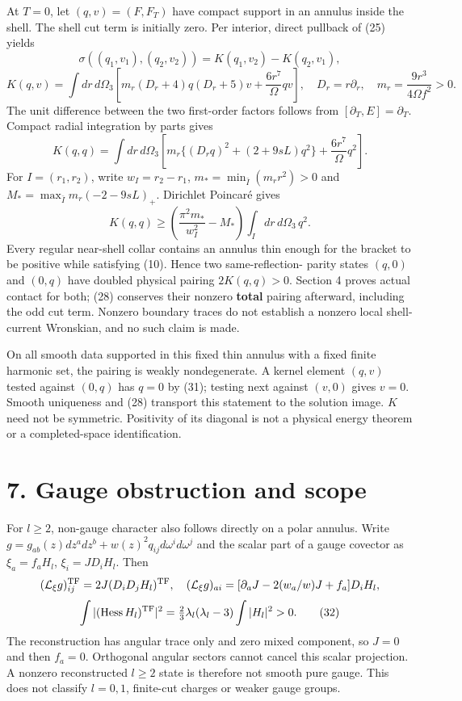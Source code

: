 \documentclass[
  10pt,
]{article}
\begin{document}
At \(T=0\), let \((q,v)=(F,F_T)\) have compact support in an annulus
inside the shell. The shell cut term is initially zero. Per interior,
direct pullback of (25) yields \[
 \sigma((q_1,v_1),(q_2,v_2))=K(q_1,v_2)-K(q_2,v_1),
\] \[
 K(q,v)=\int dr\,d\Omega_3
 \left[m_r(D_r+4)q(D_r+5)v+\frac{6r^7}{\Omega}qv\right],
 \quad D_r=r\partial_r,\quad m_r=\frac{9r^3}{4\Omega f^2}>0. \tag{29}
\] The unit difference between the two first-order factors follows from
\([\partial_T,E]=\partial_T\). Compact radial integration by parts gives
\[
 K(q,q)=\int dr\,d\Omega_3
 \left[m_r\{(D_rq)^2+(2+9sL)q^2\}+\frac{6r^7}{\Omega}q^2\right]. \tag{30}
\] For \(I=(r_1,r_2)\), write \(w_I=r_2-r_1\),
\(m_* =\min_{\bar I}(m_rr^2)>0\) and
\(M_* =\max_{\bar I}m_r(-2-9sL)_+\). Dirichlet Poincaré gives \[
 K(q,q)\ge\left(\frac{\pi^2m_*}{w_I^2}-M_*\right)
                  \int_I dr\,d\Omega_3\,q^2.             \tag{31}
\] Every regular near-shell collar contains an annulus thin enough for
the bracket to be positive while satisfying (10). Hence two
same-reflection- parity states \((q,0)\) and \((0,q)\) have doubled
physical pairing \(2K(q,q)>0\). Section 4 proves actual contact for
both; (28) conserves their nonzero \textbf{total} pairing afterward,
including the odd cut term. Nonzero boundary traces do not establish a
nonzero local shell-current Wronskian, and no such claim is made.

On all smooth data supported in this fixed thin annulus with a fixed
finite harmonic set, the pairing is weakly nondegenerate. A kernel
element \((q,v)\) tested against \((0,q)\) has \(q=0\) by (31); testing
next against \((v,0)\) gives \(v=0\). Smooth uniqueness and (28)
transport this statement to the solution image. \(K\) need not be
symmetric. Positivity of its diagonal is not a physical energy theorem
or a completed-space identification.

\section{7. Gauge obstruction and
scope}\label{gauge-obstruction-and-scope}

For \(l\ge2\), non-gauge character also follows directly on a polar
annulus. Write \(g=g_{ab}(z)dz^adz^b+w(z)^2q_{ij}d\omega^id\omega^j\)
and the scalar part of a gauge covector as \(\xi_a=f_aH_l\),
\(\xi_i=JD_iH_l\). Then \[
 (\mathcal L_\xi g)_{ij}^{\rm TF}=2J(D_iD_jH_l)^{\rm TF},\quad
 (\mathcal L_\xi g)_{ai}=[\partial_aJ-2(w_a/w)J+f_a]D_iH_l,
\] \[
 \int|(\operatorname{Hess}H_l)^{\rm TF}|^2
    =\tfrac23\lambda_l(\lambda_l-3)\int|H_l|^2>0.          \tag{32}
\] The reconstruction has angular trace only and zero mixed component,
so \(J=0\) and then \(f_a=0\). Orthogonal angular sectors cannot cancel
this scalar projection. A nonzero reconstructed \(l\ge2\) state is
therefore not smooth pure gauge. This does not classify \(l=0,1\),
finite-cut charges or weaker gauge groups.
\end{document}
